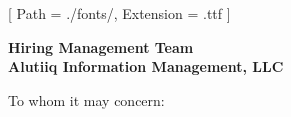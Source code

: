 


\renewcommand{\photo}[2]{}

\geometry{
  left=2cm,
  right=2cm,
  top=2cm,
  bottom=2cm
}



\makecvheader

\setmainfont{NotoSans-Regular}[
  Path = ./fonts/,
  Extension = .ttf
]

\vspace{1cm}
\indent\textbf{Hiring Management Team}\\
\indent\textbf{Alutiiq Information Management, LLC}

\vspace{0.5cm}

\noindent To whom it may concern:

\vspace{0.5cm}

